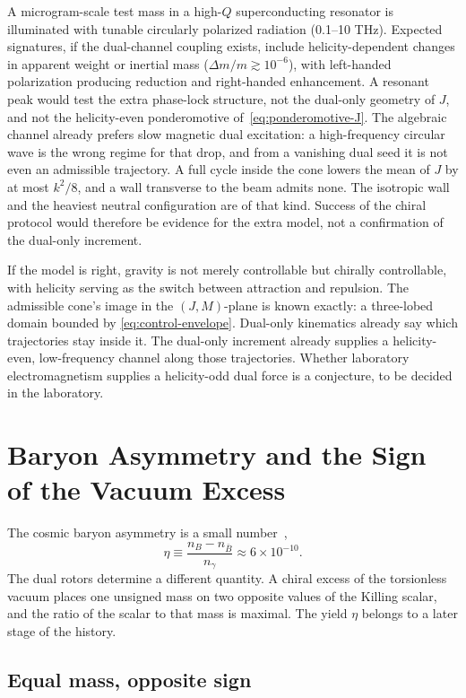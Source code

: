 \documentclass[a4paper]{article}
\begin{document}
A microgram-scale test mass in a high-$Q$ superconducting resonator is illuminated with tunable circularly polarized radiation (0.1--10 THz). Expected signatures, if the dual-channel coupling exists, include helicity-dependent changes in apparent weight or inertial mass ($\Delta m/m \gtrsim 10^{-6}$), with left-handed polarization producing reduction and right-handed enhancement. A resonant peak would test the extra phase-lock structure, not the dual-only geometry of $J$, and not the helicity-even ponderomotive of~\eqref{eq:ponderomotive-J}. The algebraic channel already prefers slow magnetic dual excitation: a high-frequency circular wave is the wrong regime for that drop, and from a vanishing dual seed it is not even an admissible trajectory. A full cycle inside the cone lowers the mean of $J$ by at most $k^2/8$, and a wall transverse to the beam admits none. The isotropic wall and the heaviest neutral configuration are of that kind. Success of the chiral protocol would therefore be evidence for the extra model, not a confirmation of the dual-only increment.

If the model is right, gravity is not merely controllable but chirally controllable, with helicity serving as the switch between attraction and repulsion. The admissible cone's image in the $(J,M)$-plane is known exactly: a three-lobed domain bounded by \eqref{eq:control-envelope}. Dual-only kinematics already say which trajectories stay inside it. The dual-only increment already supplies a helicity-even, low-frequency channel along those trajectories. Whether laboratory electromagnetism supplies a helicity-odd dual force is a conjecture, to be decided in the laboratory.

\section{Baryon Asymmetry and the Sign of the Vacuum Excess}
\label{sec:baryonasymmetry}

The cosmic baryon asymmetry is a small number~\cite{planck2018},
\[
\eta \equiv \frac{n_B-n_{\bar B}}{n_\gamma}\approx 6\times 10^{-10}.
\]
The dual rotors determine a different quantity. A chiral excess of the torsionless vacuum places one unsigned mass on two opposite values of the Killing scalar, and the ratio of the scalar to that mass is maximal. The yield $\eta$ belongs to a later stage of the history.

\subsection{Equal mass, opposite sign}
\end{document}
